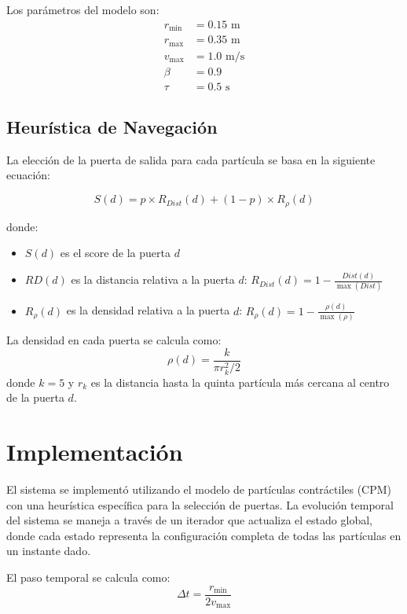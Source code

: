 \documentclass[12pt]{article}
\begin{document}
Los parámetros del modelo son:
\begin{align}
r_{\text{min}} &= 0.15\text{ m} \\
r_{\text{max}} &= 0.35\text{ m} \\
v_{\text{max}} &= 1.0\text{ m/s} \\
\beta &= 0.9 \\
\tau &= 0.5\text{ s}
\end{align}

\subsection{Heurística de Navegación}
La elección de la puerta de salida para cada partícula se basa en la siguiente ecuación:

\begin{equation}
S(d) = p \times R_{Dist}(d) + (1-p) \times R_\rho(d)
\end{equation}

donde:
\begin{itemize}
    \item $S(d)$ es el score de la puerta $d$
    \item $RD(d)$ es la distancia relativa a la puerta $d$: $R_{Dist}(d) = 1 - \frac{Dist(d)}{\max(Dist)}$
    \item $R_\rho(d)$ es la densidad relativa a la puerta $d$: $R_\rho(d) = 1 - \frac{\rho(d)}{\max(\rho)}$
\end{itemize}

La densidad en cada puerta se calcula como:
\begin{equation}
\rho(d) = \frac{k}{\pi r_k^2/2}
\end{equation}
donde $k=5$ y $r_k$ es la distancia hasta la quinta partícula más cercana al centro de la puerta $d$.

\section{Implementación}
El sistema se implementó utilizando el modelo de partículas contráctiles (CPM) con una heurística específica para la selección de puertas. La evolución temporal del sistema se maneja a través de un iterador que actualiza el estado global, donde cada estado representa la configuración completa de todas las partículas en un instante dado.

El paso temporal se calcula como:
\begin{equation}
\Delta t = \frac{r_{\text{min}}}{2v_{\text{max}}}
\end{equation}
\end{document}
